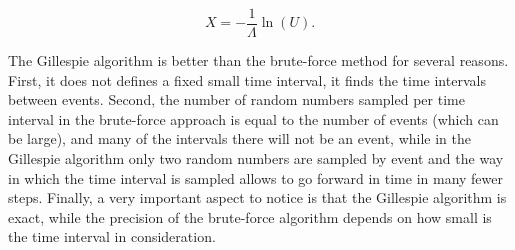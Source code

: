 \begin{equation*}
  X = -\frac{1}{\Lambda}\ln(U).
\end{equation*}

The Gillespie algorithm is better than the brute-force method for several reasons. First, it does not defines a fixed small time interval, it finds the time intervals between events. Second, the number of random numbers sampled per time interval in the brute-force approach is equal to the number of events (which can be large), and many of the intervals there will not be an event, while in the Gillespie algorithm only two random numbers are sampled by event and the way in which the time interval is sampled allows to go forward in time in many fewer steps. Finally, a very important aspect to notice is that the Gillespie algorithm is exact, while the precision of the brute-force algorithm depends on how small is the time interval in consideration.
